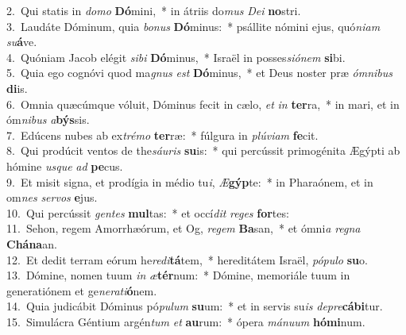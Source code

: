 {2.~}Qui statis in \textit{do}\textit{mo} \textbf{Dó}mini,~* in átriis do\textit{mus} \textit{De}\textit{i} \textbf{no}stri.\\
{3.~}Laudáte Dóminum, quia \textit{bo}\textit{nus} \textbf{Dó}minus:~* psállite nómini ejus, quó\textit{ni}\textit{am} \textit{su}\textbf{á}ve.\\
{4.~}Quóniam Jacob elégit \textit{si}\textit{bi} \textbf{Dó}minus,~* Israël in posses\textit{si}\textit{ó}\textit{nem} \textbf{si}bi.\\
{5.~}Quia ego cognóvi quod ma\textit{gnus} \textit{est} \textbf{Dó}minus,~* et Deus noster præ \textit{óm}\textit{ni}\textit{bus} \textbf{di}is.\\
{6.~}Omnia quæcúmque vóluit, Dóminus fecit in cælo, \textit{et} \textit{in} \textbf{ter}ra,~* in mari, et in óm\textit{ni}\textit{bus} \textit{a}\textbf{býs}sis.\\
{7.~}Edúcens nubes ab ex\textit{tré}\textit{mo} \textbf{ter}ræ:~* fúlgura in \textit{plú}\textit{vi}\textit{am} \textbf{fe}cit.\\
{8.~}Qui prodúcit ventos de the\textit{sáu}\textit{ris} \textbf{su}is:~* qui percússit primogénita Ægýpti ab hómine \textit{us}\textit{que} \textit{ad} \textbf{pe}cus.\\
{9.~}Et misit signa, et prodígia in médio tu\textit{i}, \textit{Æ}\textbf{gýp}te:~* in Pharaónem, et in om\textit{nes} \textit{ser}\textit{vos} \textbf{e}jus.\\
{10.~}Qui percússit \textit{gen}\textit{tes} \textbf{mul}tas:~* et occí\textit{dit} \textit{re}\textit{ges} \textbf{for}tes:\\
{11.~}Sehon, regem Amorrhæórum, et Og, \textit{re}\textit{gem} \textbf{Ba}san,~* et ómni\textit{a} \textit{re}\textit{gna} \textbf{Chá}\textbf{na}an.\\
{12.~}Et dedit terram eórum he\textit{re}\textit{di}\textbf{tá}tem,~* hereditátem Israël, \textit{pó}\textit{pu}\textit{lo} \textbf{su}o.\\
{13.~}Dómine, nomen tuum \textit{in} \textit{æ}\textbf{tér}num:~* Dómine, memoriále tuum in generatiónem et ge\textit{ne}\textit{ra}\textit{ti}\textbf{ó}nem.\\
{14.~}Quia judicábit Dóminus pó\textit{pu}\textit{lum} \textbf{su}um:~* et in servis su\textit{is} \textit{de}\textit{pre}\textbf{cá}\textbf{bi}tur.\\
{15.~}Simulácra Géntium argén\textit{tum} \textit{et} \textbf{au}rum:~* ópera \textit{má}\textit{nu}\textit{um} \textbf{hó}\textbf{mi}num.\\
